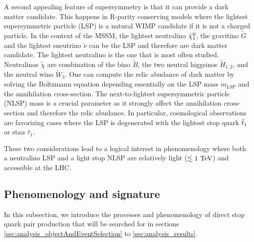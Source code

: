 

        A second appealing feature of supersymmetry is that it can provide a dark matter
        candidate. This happens in R-parity conserving models where the lightest supersymmetric
        particle (LSP) is a natural WIMP candidate if it is not a charged particle. In the
        context of the MSSM, the lightest neutralino $\tilde{\chi}_1^0$, the gravitino $\tilde{G}$
        and the lightest sneutrino $\tilde{\nu}$ can be the LSP and therefore are dark matter
        candidate. The lightest neutralino is the one that is most often studied. Neutralinos
        $\tilde{\chi}$ are combination of the bino $\tilde{B}$, the two neutral higgsinos
        $\tilde{H}_{1,2}$, and the neutral wino $\tilde{W}_3$. One can compute the relic
        abudance of dark matter by solving the Boltzmann equation \cite{EllisDarkMatter}
        depending essentially on the LSP mass $m_{\text{LSP}}$ and the annihilation cross-section.
        The next-to-lightest supersymmetric particle (NLSP) mass is a crucial parameter as
        it strongly affect the annihilation cross-section and therefore the relic abudance.
        In particular, cosmological observations are favorizing cases where the LSP is
        degenerated with the lightest stop quark $\tilde{t}_1$ or stau $\tilde{\tau_1}$.

        These two considerations lead to a logical interest in phenomenology where both a
        neutralino LSP and a light stop NLSP are relatively light ($\lesssim 1~\text{TeV}$) and
        accessible at the LHC.

        \subsection{Phenomenology and signature}

        In this subsection, we introduce the processes and phenomenology of direct stop
        quark pair production that will be searched for in sections
        \ref{sec:analysis_objectAndEventSelection} to \ref{sec:analysis_results}.

